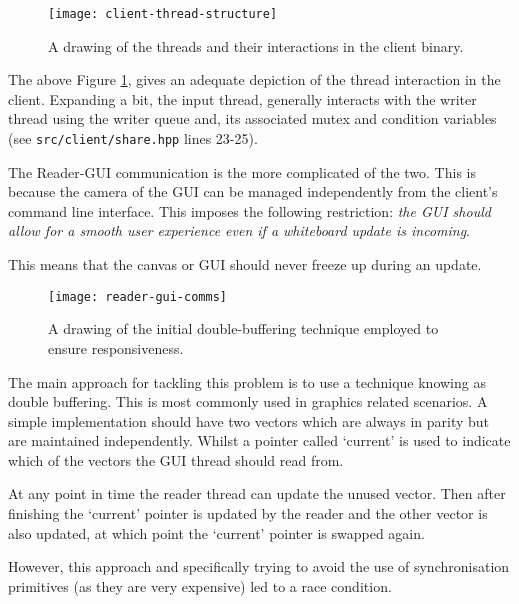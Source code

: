 \documentclass[article]{uom-coursework}
\begin{document}
\begin{figure}[H]
\centering
\begin{mdframed}[backgroundcolor=OffWhite]
\texttt{[image: client-thread-structure]}
\end{mdframed}
\caption{A drawing of the threads and their interactions in the
client binary.}
\label{fig:clientthreads}
\end{figure}

The above Figure \ref{fig:clientthreads}, gives an adequate
depiction of the thread interaction in the client. Expanding a
bit, the input thread, generally interacts with the writer
thread using the writer queue and, its associated mutex and
condition variables (see \texttt{src/client/share.hpp} lines
23-25).

The Reader-GUI communication is the more complicated of the two.
This is because the camera of the GUI can be managed
independently from the client's command line interface. This
imposes the following restriction: \emph{the GUI should allow
for a smooth user experience even if a whiteboard update is
incoming}.

This means that the canvas or GUI should never freeze up during
an update.

\begin{figure}[H]
\centering
\begin{mdframed}[backgroundcolor=OffWhite]
\texttt{[image: reader-gui-comms]}
\end{mdframed}
\caption{A drawing of the initial double-buffering technique
employed to ensure responsiveness.}
\label{fig:readerguicomms}
\end{figure}

The main approach for tackling this problem is to use a
technique knowing as double buffering. This is most commonly
used in graphics related scenarios. A simple implementation
should have two vectors which are always in parity but are
maintained independently. Whilst a pointer called `current' is
used to indicate which of the vectors the GUI thread should read
from.

At any point in time the reader thread can update the unused
vector. Then after finishing the `current' pointer is updated by
the reader and the other vector is also updated, at which point
the `current' pointer is swapped again.

However, this approach and specifically trying to avoid the use
of synchronisation primitives (as they are very expensive) led
to a race condition.
\end{document}

